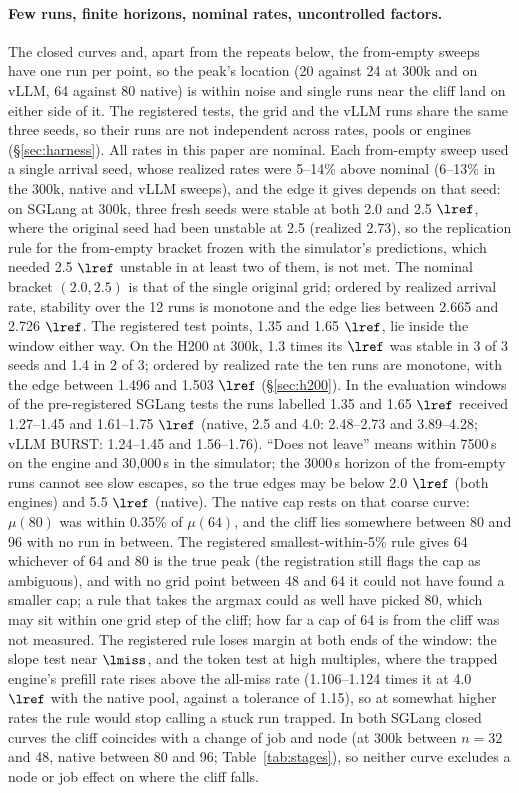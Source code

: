 \paragraph{Few runs, finite horizons, nominal rates, uncontrolled factors.} The closed curves and, apart from the repeats below, the from-empty sweeps have one run per point, so the peak's location (20 against 24 at 300k and on vLLM, 64 against 80 native) is within noise and single runs near the cliff land on either side of it. The registered tests, the grid and the vLLM runs share the same three seeds, so their runs are not independent across rates, pools or engines (\S\ref{sec:harness}). All rates in this paper are nominal. Each from-empty sweep used a single arrival seed, whose realized rates were 5--14\% above nominal (6--13\% in the 300k, native and vLLM sweeps), and the edge it gives depends on that seed: on SGLang at 300k, three fresh seeds were stable at both 2.0 and 2.5 $\lref$, where the original seed had been unstable at 2.5 (realized 2.73), so the replication rule for the from-empty bracket frozen with the simulator's predictions, which needed 2.5 $\lref$ unstable in at least two of them, is not met. The nominal bracket $(2.0,2.5)$ is that of the single original grid; ordered by realized arrival rate, stability over the 12 runs is monotone and the edge lies between 2.665 and 2.726 $\lref$. The registered test points, 1.35 and 1.65 $\lref$, lie inside the window either way. On the H200 at 300k, 1.3 times its $\lref$ was stable in 3 of 3 seeds and 1.4 in 2 of 3; ordered by realized rate the ten runs are monotone, with the edge between 1.496 and 1.503 $\lref$ (\S\ref{sec:h200}). In the evaluation windows of the pre-registered SGLang tests the runs labelled 1.35 and 1.65 $\lref$ received 1.27--1.45 and 1.61--1.75 $\lref$ (native, 2.5 and 4.0: 2.48--2.73 and 3.89--4.28; vLLM BURST: 1.24--1.45 and 1.56--1.76). ``Does not leave'' means within 7500\,s on the engine and 30,000\,s in the simulator; the 3000\,s horizon of the from-empty runs cannot see slow escapes, so the true edges may be below 2.0 $\lref$ (both engines) and 5.5 $\lref$ (native). The native cap rests on that coarse curve: $\mu(80)$ was within 0.35\% of $\mu(64)$, and the cliff lies somewhere between 80 and 96 with no run in between. The registered smallest-within-5\% rule gives 64 whichever of 64 and 80 is the true peak (the registration still flags the cap as ambiguous), and with no grid point between 48 and 64 it could not have found a smaller cap; a rule that takes the argmax could as well have picked 80, which may sit within one grid step of the cliff; how far a cap of 64 is from the cliff was not measured. The registered rule loses margin at both ends of the window: the slope test near $\lmiss$, and the token test at high multiples, where the trapped engine's prefill rate rises above the all-miss rate (1.106--1.124 times it at 4.0 $\lref$ with the native pool, against a tolerance of 1.15), so at somewhat higher rates the rule would stop calling a stuck run trapped. In both SGLang closed curves the cliff coincides with a change of job and node (at 300k between $n=32$ and 48, native between 80 and 96; Table~\ref{tab:stages}), so neither curve excludes a node or job effect on where the cliff falls. 